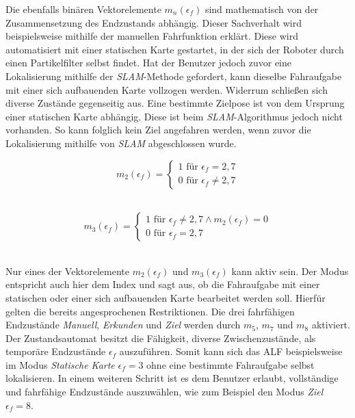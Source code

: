 		Die ebenfalls binären Vektorelemente $m_n(\epsilon_f)$ sind mathematisch von der Zusammensetzung des Endzustands abhängig. Dieser Sachverhalt wird beispielsweise mithilfe der manuellen Fahrfunktion erklärt. Diese wird automatisiert mit einer statischen Karte gestartet, in der sich der Roboter durch einen Partikelfilter selbst findet. Hat der Benutzer jedoch zuvor eine Lokalisierung mithilfe der \textit{SLAM}-Methode gefordert, kann dieselbe Fahraufgabe mit einer sich aufbauenden Karte vollzogen werden. Widerrum schließen sich diverse Zustände gegenseitig aus. Eine bestimmte Zielpose ist von dem Ursprung einer statischen Karte abhängig. Diese ist beim \textit{SLAM}-Algorithmus jedoch nicht vorhanden. So kann folglich kein Ziel angefahren werden, wenn zuvor die Lokalisierung mithilfe von \textit{SLAM} abgeschlossen wurde.\\
		
		\begin{figure}[H]
			\centering
			\begin{minipage}[b]{0.4\textwidth}
				\begin{equation}
					m_2(\epsilon_f)=\left\{\begin{array}{ll} 1 \text{ für } \epsilon_f=2,7 \\
					0 \text{ für }\epsilon_f\neq 2,7\end{array}\right. 
					\label{eq: m2}
				\end{equation}\\
			\end{minipage}
			\hfill
			\begin{minipage}[b]{0.55\textwidth}
				\begin{equation}
					m_3(\epsilon_f)=\left\{\begin{array}{ll} 1 \text{ für } \epsilon_f\neq2,7 \wedge m_2(\epsilon_f) = 0 \\
					0 \text{ für }\epsilon_f= 2,7\end{array}\right.
					\label{eq: m3}
				\end{equation}\\
			\end{minipage}
		\end{figure}
		
		Nur eines der Vektorelemente $m_2(\epsilon_f)$ und $m_3(\epsilon_f)$ kann aktiv sein. Der Modus entspricht auch hier dem Index und sagt aus, ob die Fahraufgabe mit einer statischen oder einer sich aufbauenden Karte bearbeitet werden soll. Hierfür gelten die bereits angesprochenen Restriktionen. Die drei fahrfähigen Endzustände \textit{Manuell}, \textit{Erkunden} und \textit{Ziel} werden durch $m_5$, $m_7$ und $m_8$ aktiviert. Der Zustandsautomat besitzt die Fähigkeit, diverse Zwischenzustände, als temporäre Endzustände $\epsilon_f$ auszuführen. Somit kann sich das ALF beispielsweise im Modus \textit{Statische Karte} $\epsilon_f=3$ ohne eine bestimmte Fahraufgabe selbst lokalisieren. In einem weiteren Schritt ist es dem Benutzer erlaubt, vollständige und fahrfähige Endzustände auszuwählen, wie zum Beispiel den Modus \textit{Ziel} $\epsilon_f=8$.\\
		
